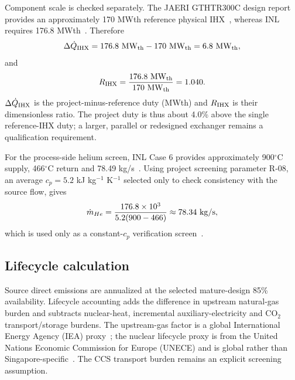 Component scale is checked separately. The JAERI GTHTR300C design report provides an approximately 170 MWth reference physical IHX~\cite{jaeri2004gthtr300c}, whereas INL requires 176.8 MWth~\cite{inltev961}. Therefore
\begin{equation}\label{eq:ihx-duty-gap}
\Delta \dot Q_{\rm IHX}=176.8~\mathrm{MW_{th}}-170~\mathrm{MW_{th}}=6.8~\mathrm{MW_{th}},
\end{equation}
and
\begin{equation}\label{eq:ihx-duty-ratio}
R_{\rm IHX}=\frac{176.8~\mathrm{MW_{th}}}{170~\mathrm{MW_{th}}}=1.040.
\end{equation}
$\Delta\dot Q_{\rm IHX}$ is the project-minus-reference duty (MWth) and $R_{\rm IHX}$ is their dimensionless ratio. The project duty is thus about 4.0\% above the single reference-IHX duty; a larger, parallel or redesigned exchanger remains a qualification requirement.

For the process-side helium screen, INL Case 6 provides approximately 900$^\circ$C supply, 466$^\circ$C return and 78.49 kg/s~\cite{inltev961}. Using project screening parameter R-08, an average $c_p=5.2$ kJ kg$^{-1}$ K$^{-1}$ selected only to check consistency with the source flow, gives
\begin{equation}\label{eq:helium-flow-check}
\dot m_{He}=\frac{176.8\times10^3}{5.2(900-466)}\approx78.34\ {\rm kg/s},
\end{equation}
which is used only as a constant-$c_p$ verification screen~\cite{inltev961}.



\subsection{Lifecycle calculation}
Source direct emissions are annualized at the selected mature-design 85\% availability. Lifecycle accounting adds the difference in upstream natural-gas burden and subtracts nuclear-heat, incremental auxiliary-electricity and CO$_2$ transport/storage burdens. The upstream-gas factor is a global International Energy Agency (IEA) proxy~\cite{iea2026lng}; the nuclear lifecycle proxy is from the United Nations Economic Commission for Europe (UNECE) and is global rather than Singapore-specific~\cite{unece2022lca}. The CCS transport burden remains an explicit screening assumption.


